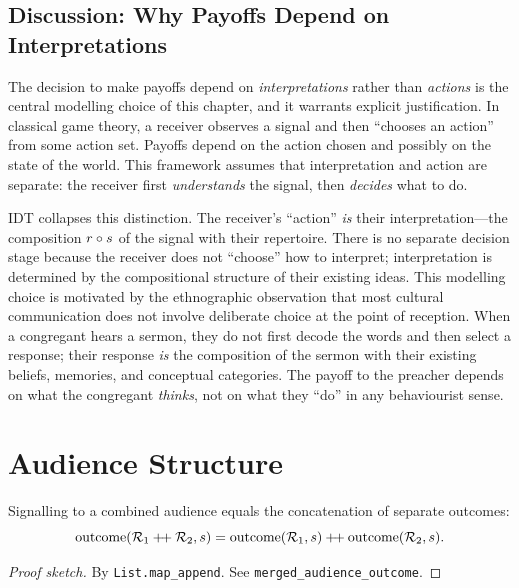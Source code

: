 \subsection*{Discussion: Why Payoffs Depend on Interpretations}

The decision to make payoffs depend on \emph{interpretations} rather
than \emph{actions} is the central modelling choice of this chapter, and
it warrants explicit justification.  In classical game theory, a receiver
observes a signal and then ``chooses an action'' from some action set.
Payoffs depend on the action chosen and possibly on the state of the
world.  This framework assumes that interpretation and action are
separate: the receiver first \emph{understands} the signal, then
\emph{decides} what to do.

IDT collapses this distinction.  The receiver's ``action'' \emph{is}
their interpretation---the composition $r \circ s$ of the signal with
their repertoire.  There is no separate decision stage because the
receiver does not ``choose'' how to interpret; interpretation is
determined by the compositional structure of their existing ideas.  This
modelling choice is motivated by the ethnographic observation that most
cultural communication does not involve deliberate choice at the point
of reception.  When a congregant hears a sermon, they do not first
decode the words and then select a response; their response \emph{is}
the composition of the sermon with their existing beliefs, memories,
and conceptual categories.  The payoff to the preacher depends on what
the congregant \emph{thinks}, not on what they ``do'' in any
behaviourist sense.

\section{Audience Structure}
\label{sec:ch2:audience}

\begin{theorem}
\label{thm:merged-audience}
Signalling to a combined audience equals the concatenation of separate
outcomes:
\[
  \operatorname{outcome}(\mathcal{R}_1 \mathbin{+\!+} \mathcal{R}_2, s)
  = \operatorname{outcome}(\mathcal{R}_1, s) \mathbin{+\!+}
    \operatorname{outcome}(\mathcal{R}_2, s).
\]
\end{theorem}

\begin{proof}[Proof sketch]
By \texttt{List.map\_append}.  See \texttt{merged\_audience\_outcome}.
\end{proof}

